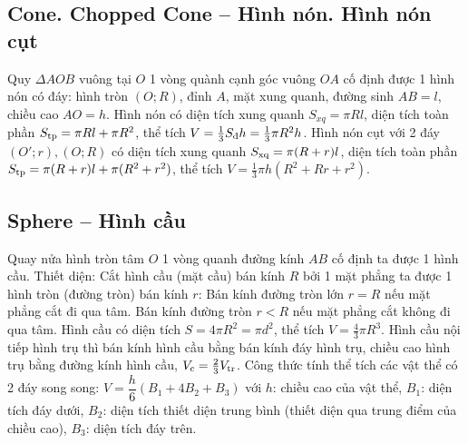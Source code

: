 \documentclass{article}
\begin{document}
\subsection{Cone. Chopped Cone -- Hình nón. Hình nón cụt}
 Quy $\Delta AOB$ vuông tại $O$ 1 vòng quành cạnh góc vuông $OA$ cố định được 1 hình nón có đáy: hình tròn $(O;R)$, đỉnh $A$, mặt xung quanh, đường sinh $AB = l$, chiều cao $AO = h$.  Hình nón có diện tích xung quanh $S_{xq} = \pi Rl$, diện tích toàn phần $S_{\rm tp} = \pi Rl + \pi R^2$, thể tích $V = \frac{1}{3}S_{\scriptsize\mbox{\rm đ}}h = \frac{1}{3}\pi R^2h$.  Hình nón cụt với 2 đáy $(O';r),(O;R)$ có diện tích xung quanh $S_{\rm xq} = \pi(R + r)l$, diện tích toàn phần $S_{\rm tp} = \pi(R + r)l + \pi(R^2 + r^2)$, thể tích $V = \frac{1}{3}\pi h(R^2 + Rr + r^2)$.

\subsection{Sphere -- Hình cầu}
 Quay nửa hình tròn tâm $O$ 1 vòng quanh đường kính $AB$ cố định ta được 1 hình cầu.  {\sf Thiết diện}: Cắt hình cầu (mặt cầu) bán kính $R$ bởi 1 mặt phẳng ta được 1 hình tròn (đường tròn) bán kính $r$: Bán kính đường tròn lớn $r = R$ nếu mặt phẳng cắt đi qua tâm. Bán kính đường tròn $r < R$ nếu mặt phẳng cắt không đi qua tâm.  Hình cầu có diện tích $S = 4\pi R^2 = \pi d^2$, thể tích $V = \frac{4}{3}\pi R^3$.  Hình cầu nội tiếp hình trụ thì bán kính hình cầu bằng bán kính đáy hình trụ, chiều cao hình trụ bằng đường kính hình cầu, $V_{\rm c} = \frac{2}{3}V_{\rm tr}$.  Công thức tính thể tích các vật thể có 2 đáy song song: $V = \dfrac{h}{6}(B_1 + 4B_2 + B_3)$ với $h$: chiều cao của vật thể, $B_1$: diện tích đáy dưới, $B_2$: diện tích thiết diện trung bình (thiết diện qua trung điểm của chiều cao), $B_3$: diện tích đáy trên.


\printbibliography[heading=bibintoc]
	
\end{document}
